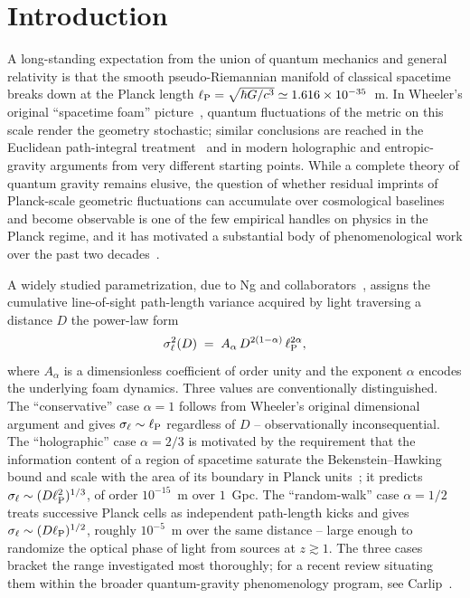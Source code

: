 \section{Introduction}
\label{sec:intro}

A long-standing expectation from the union of quantum mechanics and general
relativity is that the smooth pseudo-Riemannian manifold of classical spacetime
breaks down at the Planck length
$\ell_{\rm P} = \sqrt{\hbar G/c^3} \simeq 1.616\times 10^{-35}$~m.
In Wheeler's original ``spacetime foam'' picture~\cite{Wheeler1955}, quantum
fluctuations of the metric on this scale render the geometry stochastic;
similar conclusions are reached in the Euclidean path-integral
treatment~\cite{Hawking1978} and in modern holographic and entropic-gravity
arguments from very different starting points.
While a complete theory of quantum gravity remains elusive, the question of
whether residual imprints of Planck-scale geometric fluctuations can accumulate
over cosmological baselines and become observable is one of the few empirical
handles on physics in the Planck regime, and it has motivated a substantial
body of phenomenological work over the past two
decades~\cite{Carlip2023,NgPerlman2022}.

A widely studied parametrization, due to Ng and
collaborators~\cite{Ng2001,Ng2003,NgPerlman2022}, assigns the cumulative
line-of-sight path-length variance acquired by light traversing a distance $D$
the power-law form
\begin{equation}
  \sigma_\ell^2(D) \;=\; A_\alpha\, D^{2(1-\alpha)}\, \ell_{\rm P}^{2\alpha},
  \label{eq:NgPerlmanIntro}
\end{equation}
where $A_\alpha$ is a dimensionless coefficient of order unity and the exponent
$\alpha$ encodes the underlying foam dynamics.
Three values are conventionally distinguished.
The ``conservative'' case $\alpha = 1$ follows from Wheeler's original
dimensional argument and gives $\sigma_\ell \sim \ell_{\rm P}$ regardless of
$D$ -- observationally inconsequential.
The ``holographic'' case $\alpha = 2/3$ is motivated by the requirement that
the information content of a region of spacetime saturate the
Bekenstein--Hawking bound and scale with the area of its boundary in Planck
units~\cite{Ng2001}; it predicts $\sigma_\ell \sim (D\ell_{\rm P}^2)^{1/3}$,
of order $10^{-15}$~m over $1$~Gpc.
The ``random-walk'' case $\alpha = 1/2$ treats successive Planck cells as
independent path-length kicks and gives
$\sigma_\ell \sim (D\ell_{\rm P})^{1/2}$, roughly $10^{-5}$~m over the same
distance -- large enough to randomize the optical phase of light from sources
at $z \gtrsim 1$.
The three cases bracket the range investigated most thoroughly; for a recent
review situating them within the broader quantum-gravity phenomenology
program, see Carlip~\cite{Carlip2023}.

